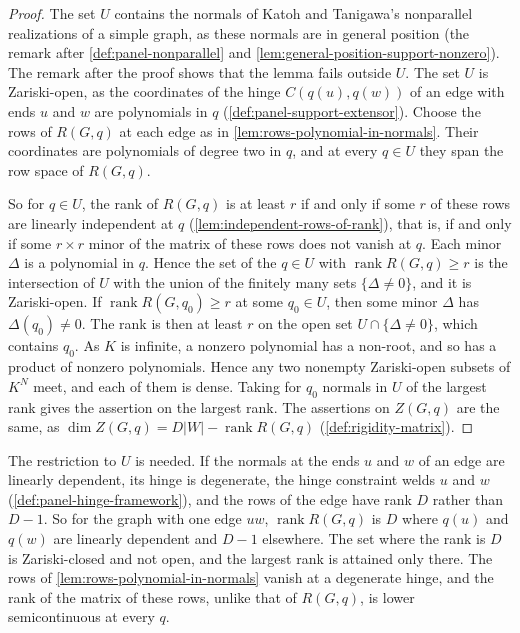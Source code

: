 \begin{proof}
  \leanok
  The set $U$ contains the normals of Katoh and Tanigawa's nonparallel
  realizations of a simple graph, as these normals are in general
  position (the remark after \cref{def:panel-nonparallel} and
  \cref{lem:general-position-support-nonzero}). The remark after the
  proof shows that the lemma fails outside $U$. The set $U$ is Zariski-open,
  as the coordinates of the hinge $C(q(u), q(w))$ of an edge with ends
  $u$ and $w$ are polynomials in $q$
  (\cref{def:panel-support-extensor}). Choose the rows
  of $R(G,q)$ at each edge as in \cref{lem:rows-polynomial-in-normals}.
  Their coordinates are polynomials of degree two in $q$, and at every
  $q \in U$ they span the row space of $R(G,q)$.

  So for $q \in U$, the rank of $R(G,q)$ is at least $r$ if and only if
  some $r$ of these rows are linearly independent at $q$
  (\cref{lem:independent-rows-of-rank}), that is, if and only if some
  $r \times r$ minor of the matrix of these rows does not vanish at $q$.
  Each
  minor $\Delta$ is a polynomial in $q$. Hence the set of the $q \in U$
  with $\operatorname{rank} R(G,q) \ge r$ is the intersection of $U$ with
  the union of the finitely many sets $\{\Delta \neq 0\}$, and it is
  Zariski-open.
  If $\operatorname{rank} R(G,q_0) \ge r$ at some $q_0 \in U$, then some
  minor $\Delta$ has $\Delta(q_0) \neq 0$. The rank is then at least $r$
  on the open set $U \cap \{\Delta \neq 0\}$, which contains $q_0$. As $K$
  is infinite, a nonzero polynomial has a non-root, and so has a product
  of nonzero polynomials. Hence any two nonempty Zariski-open subsets of
  $K^N$ meet, and each of them is dense. Taking for $q_0$ normals in $U$
  of the largest rank gives the assertion on the largest rank. The
  assertions on $Z(G,q)$ are the same, as
  $\dim Z(G,q) = D|W| - \operatorname{rank} R(G,q)$
  (\cref{def:rigidity-matrix}).
\end{proof}

The restriction to $U$ is needed. If the normals at the ends $u$ and
$w$ of an edge are linearly dependent, its hinge is degenerate, the hinge
constraint welds $u$ and $w$ (\cref{def:panel-hinge-framework}), and the
rows of the edge have rank $D$ rather than $D - 1$. So for the graph with
one edge $uw$, $\operatorname{rank} R(G,q)$ is $D$ where $q(u)$ and
$q(w)$ are linearly dependent and $D - 1$ elsewhere. The set where the
rank is $D$ is Zariski-closed and not open, and the largest rank is
attained only there. The rows of \cref{lem:rows-polynomial-in-normals}
vanish at a degenerate hinge, and the rank of the matrix of these rows,
unlike that of $R(G,q)$, is lower semicontinuous at every $q$.

